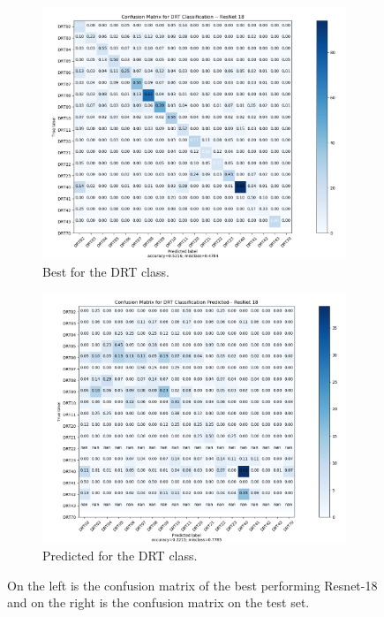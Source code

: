 \begin{figure}
{\begin{subfigure}[b]{.6\textwidth}
\centering
\includegraphics[width=.95\textwidth]{figures/04-drt_best.PNG}
\caption{Best for the DRT class.}
\label{fig:rescm_drt}
\end{subfigure}%
\begin{subfigure}[b]{.6\textwidth}
\centering
\includegraphics[width=.95\textwidth]{figures/04-drt_pred.PNG}
\caption{Predicted for the DRT class.}
\label{fig:rescm_drt_pred}
\end{subfigure}%
}
\caption[Confusion matrices of classes trained on Resnet-18]{On the left is the confusion matrix of the best performing Resnet-18 and on the right is the confusion matrix on the test set.}
\label{fig:rescm}
\end{figure}

